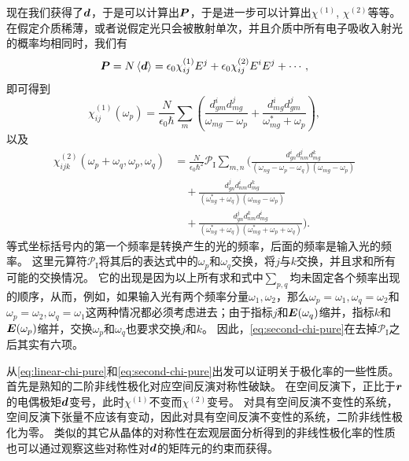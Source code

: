 现在我们获得了$\vb*{d}$，于是可以计算出$\vb*{P}$，于是进一步可以计算出$\chi^{(1)}$, $\chi^{(2)}$等等。
在假定介质稀薄，或者说假定光只会被散射单次，并且介质中所有电子吸收入射光的概率均相同时，我们有
\[
    \vb*{P} = N \expval*{\vb*{d}} = \epsilon_0 \chi^{(1)}_{ij} E^j + \epsilon_0 \chi^{(2)}_{ij} E^i E^j + \cdots,
\]
即可得到
\begin{equation}
    \chi^{(1)}_{ij}(\omega_p) = \frac{N}{\epsilon_0 \hbar} \sum_{m} \left( \frac{ d_{gm}^i {d}_{mg}^j}{\omega_{mg} - \omega_p} + \frac{{d}_{mg}^i d_{gm}^j}{\omega_{mg}^* + \omega_p} \right)  ,
    \label{eq:linear-chi-pure}
\end{equation}
以及
\begin{equation}
    \begin{aligned}
        \chi^{(2)}_{ijk}(\omega_p + \omega_q, \omega_p, \omega_q) &= \frac{N}{\epsilon_0 \hbar^2} \mathcal{P}_\text{I} \sum_{m, n} \Bigg( \frac{d_{gn}^i d_{nm}^j d_{mg}^k }{(\omega_{ng} - \omega_p - \omega_q) (\omega_{mg} - \omega_p)} \\
        &\quad + \frac{d_{gn}^j d_{nm}^i d_{mg}^k }{(\omega_{ng}^* + \omega_q) (\omega_{mg} - \omega_p)} \\
        &\quad + \frac{ d_{gn}^j d_{nm}^k d_{mg}^i }{(\omega_{ng}^* + \omega_q) (\omega_{mg}^* + \omega_p + \omega_q)} \Bigg) .
    \end{aligned}
    \label{eq:second-chi-pure}
\end{equation}
等式坐标括号内的第一个频率是转换产生的光的频率，后面的频率是输入光的频率。
这里元算符$\mathcal{P}_\text{I}$将其后的表达式中的$\omega_p$和$\omega_q$交换，将$j$与$k$交换，并且求和所有可能的交换情况。
它的出现是因为以上所有求和式中$\sum_{p, q}$均未固定各个频率出现的顺序，从而，例如，如果输入光有两个频率分量$\omega_1, \omega_2$，那么$\omega_p = \omega_1, \omega_q = \omega_2$和$\omega_p = \omega_2, \omega_q = \omega_1$这两种情况都必须考虑进去；由于指标$j$和$\vb*{E}(\omega_q)$缩并，指标$k$和$\vb*{E}(\omega_p)$缩并，交换$\omega_p$和$\omega_q$也要求交换$j$和$k$。
因此，\eqref{eq:second-chi-pure}在去掉$\mathcal{P}_\text{I}$之后其实有六项。

从\eqref{eq:linear-chi-pure}和\eqref{eq:second-chi-pure}出发可以证明关于极化率的一些性质。
首先是熟知的二阶非线性极化对应空间反演对称性破缺。
在空间反演下，正比于$\vb*{r}$的电偶极矩$\vb*{d}$变号，此时$\chi^{(1)}$不变而$\chi^{(2)}$变号。
对具有空间反演不变性的系统，空间反演下张量不应该有变动，因此对具有空间反演不变性的系统，二阶非线性极化为零。
类似的其它从晶体的对称性在宏观层面分析得到的非线性极化率的性质也可以通过观察这些对称性对$\vb*{d}$的矩阵元的约束而获得。

